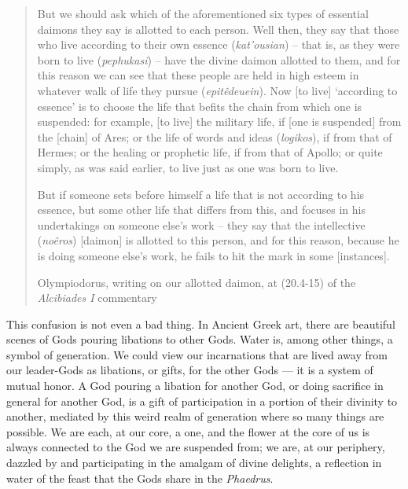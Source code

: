 \documentclass[
]{book}
\begin{document}
\begin{quote}
But we should ask which of the aforementioned six types of essential daimons they say is allotted to each person. Well then, they say that those who live according to their own essence (\emph{kat'ousian}) -- that is, as they were born to live (\emph{pephukasi}) -- have the divine daimon allotted to them, and for this reason we can see that these people are held in high esteem in whatever walk of life they pursue (\emph{epitêdeuein}). Now {[}to live{]} `according to essence' is to choose the life that befits the chain from which one is suspended: for example, {[}to live{]} the military life, if {[}one is suspended{]} from the {[}chain{]} of Ares; or the life of words and ideas (\emph{logikos}), if from that of Hermes; or the healing or prophetic life, if from that of Apollo; or quite simply, as was said earlier, to live just as one was born to live.

But if someone sets before himself a life that is not according to his essence, but some other life that differs from this, and focuses in his undertakings on someone else's work -- they say that the intellective (\emph{noêros}) {[}daimon{]} is allotted to this person, and for this reason, because he is doing someone else's work, he fails to hit the mark in some {[}instances{]}.

Olympiodorus, writing on our allotted daimon, at (20.4-15) of the \emph{Alcibiades I} commentary
\end{quote}

This confusion is not even a bad thing. In Ancient Greek art, there are beautiful scenes of Gods pouring libations to other Gods. Water is, among other things, a symbol of generation. We could view our incarnations that are lived away from our leader-Gods as libations, or gifts, for the other Gods --- it is a system of mutual honor. A God pouring a libation for another God, or doing sacrifice in general for another God, is a gift of participation in a portion of their divinity to another, mediated by this weird realm of generation where so many things are possible. We are each, at our core, a one, and the flower at the core of us is always connected to the God we are suspended from; we are, at our periphery, dazzled by and participating in the amalgam of divine delights, a reflection in water of the feast that the Gods share in the \emph{Phaedrus}.
\end{document}
